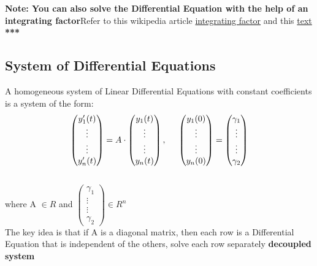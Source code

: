 \documentclass{article}
\begin{document}
\textbf{Note: You can also solve the Differential Equation with the help of an integrating factor}\newline Refer to this wikipedia article \href{https://en.wikipedia.org/wiki/Integrating_factor}{integrating factor} and this \href{https://www.mathcentre.ac.uk/resources/uploaded/mathcentre-ode.pdf}{text}
\\[3mm]
\hspace*{70mm} \textbf{***} 
\subsection*{System of Differential Equations}
A homogeneous system of Linear Differential Equations with constant coefficients is a system of the form: \\[2mm]
\begin{equation*}\begin{pmatrix} y'_1(t) \\ \vdots \\ \vdots \\ y'_n(t) \end{pmatrix} = A \cdot \begin{pmatrix} y_1(t) \\ \vdots \\ \vdots \\ y_n(t) \end{pmatrix}, \hspace{5mm} \begin{pmatrix} y_1(0) \\ \vdots \\ \vdots \\ y_n(0) \end{pmatrix} = \begin{pmatrix} \gamma_1 \\ \vdots \\ \vdots \\ \gamma_2 \end{pmatrix}\end{equation*} \\[2mm]
\hspace*{45mm} where A $\in R$ and $\begin{pmatrix} \gamma_1 \\ \vdots \\ \vdots \\ \gamma_2 \end{pmatrix} \in R^{n} $ \\[2mm]
The key idea is that if A is a diagonal matrix, then each row is a Differential Equation that is independent of the others, solve each row separately \textbf{decoupled system}
\end{document}
